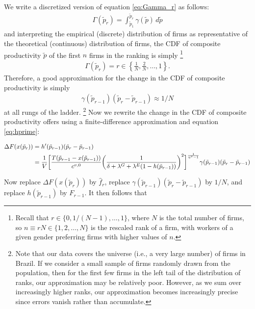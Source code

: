 %
We write a discretized version of equation \eqref{eq:Gamma_r} as follows:
%
\begin{align}
    \Gamma(\tilde{p}_{r}) = \int_{\tilde{p}_{1}}^{\tilde{p}_{r}} \gamma(\tilde{p}) \, d \tilde{p}
\end{align}
%
and interpreting the empirical (discrete) distribution of firms as representative of the theoretical (continuous) distribution of firms, the CDF of composite productivity $\tilde{p}$ of the first $n$ firms in the ranking is simply%
%
\footnote{Recall that $r \in \{ 0, 1/(N - 1), \ldots, 1 \}$, where $N$ is the total number of firms, so $n \equiv r N \in \{ 1, 2, \ldots, N \}$ is the rescaled rank of a firm, with workers of a given gender preferring firms with higher values of $n$.}
%
\begin{align}
    \Gamma(\tilde{p}_{r}) = r \in \left\{ \frac{1}{N}, \frac{2}{N}, \ldots, 1 \right\}. %
\end{align}
%
Therefore, a good approximation for the change in the CDF of composite productivity is simply
%
\begin{align}
    \gamma(\tilde{p}_{r - 1}) (\tilde{p}_{r} - \tilde{p}_{r - 1}) \approx 1/N \label{eq:approx}
\end{align}
%
at all rungs of the ladder.%
%
\footnote{Note that our data covers the universe (i.e., a very large number) of firms in Brazil. If we consider a small sample of firms randomly drawn from the population, then for the first few firms in the left tail of the distribution of ranks, our approximation may be relatively poor. However, as we sum over increasingly higher ranks, our approximation becomes increasingly precise since errors vanish rather than accumulate.} %
%
Now we rewrite the change in the CDF of composite productivity offers using a finite-difference approximation and equation \eqref{eq:hprime}:
%
\begin{small}
    \begin{align}
        \Delta F(x(\tilde{p}_{r})) &= h'(\tilde{p}_{r - 1}) (\tilde{p}_{r} - \tilde{p}_{r - 1}) \\
        &= \frac{1}{V} \biggl{[} \frac{T (\tilde{p}_{r - 1} - x(\tilde{p}_{r - 1}))}{c^{v,0}} \biggl{(} \frac{1}{\delta + \lambda^{G} + \lambda^{E} (1 - h(\tilde{p}_{r - 1}))} \biggr{)}^2 \biggr{]}^{\frac{1}{\eta^{v} - 1}} \gamma(\tilde{p}_{r - 1}) (\tilde{p}_{r} - \tilde{p}_{r - 1})
    \end{align}
\end{small}
%
Now replace $\Delta F(x(\tilde{p}_{r}))$ by $\hat{f}_{r}$, replace $\gamma(\tilde{p}_{r - 1}) (\tilde{p}_{r} - \tilde{p}_{r - 1})$ by $1/N$, and replace $h(\tilde{p}_{r - 1})$ by $F_{r - 1}$. It then follows that

